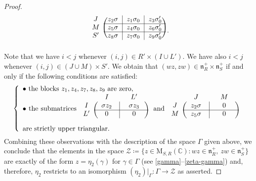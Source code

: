 \documentclass[11pt]{article}
\theoremstyle{definition}
\numberwithin{equation}{section}
\newcommand{\fn}{\mathfrak{n}}
\newcommand{\Mat}{\mathrm{M}}
\newcommand{\mC}{\mathbb{C}}
\begin{document}
\begin{proof}
\[\begin{blockarray}{cccc}
\begin{block}{c(c|c|c)}
J & z_2\sigma & z_1\sigma_0 & z_3\sigma_0'\\
\cline{2-4}
M & z_5\sigma & z_4\sigma_0 & z_6\sigma_0'\\
\cline{2-4}
S' & z_8\sigma & z_7\sigma_0 & z_9\sigma_0'\\
\end{block}
\end{blockarray}\,.
\]
Note that we have $i<j$ whenever $(i,j)\in R'\times(I\cup L')$. We have also $i<j$ whenever $(i,j)\in(J\cup M)\times S'$. We obtain that $(wz,zw)\in\fn_R^+\times \fn_S^+$ if and only if the following conditions are satisfied:
\[
\left\{\begin{array}{ll}
\mbox{$\bullet$ the blocks $z_1,z_4,z_7,z_8,z_9$ are zero},\\
\parbox{11cm}{$\bullet$ the submatrices $\begin{blockarray}{ccc}
{} & {\quad I\quad} & {\quad L'\quad}\\
\begin{block}{c(c|c)}
I & \sigma z_2 & \sigma z_3\\
\cline{2-3}
L' & 0 & 0\\
\end{block}
\end{blockarray}$
\ and $\begin{blockarray}{ccc}
{} & {\quad J\quad} & {\quad M\quad}\\
\begin{block}{c(c|c)}
J & z_2\sigma & 0\\
\cline{2-3}
M & z_5\sigma & 0\\
\end{block}
\end{blockarray}$
\ are strictly upper triangular.}
\end{array}\right.
\]
Combining these observations with the description of the space $\Gamma$ given above, we conclude that the elements in the space $\mathcal{Z}\coloneqq \{z\in\Mat_{S,R}(\mC):wz\in\fn_R^+,\ zw\in\fn_S^+\}$ are exactly of the form $z=\eta_2(\gamma)$ for $\gamma\in\Gamma$ (see \eqref{gamma}--\eqref{zeta-gamma}) and, therefore, $\eta_2$ restricts to an isomorphism $(\eta_2)|_\Gamma:\Gamma\to\mathcal{Z}$ as asserted.


\end{proof}
\end{document}
